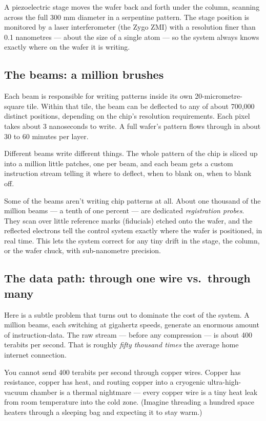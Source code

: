 \documentclass[11pt,letterpaper]{article}
\begin{document}
A piezoelectric stage moves the wafer back and forth under the column, scanning across the full 300 mm diameter in a serpentine pattern. The stage position is monitored by a laser interferometer (the Zygo ZMI) with a resolution finer than 0.1 nanometres --- about the size of a single atom --- so the system always knows exactly where on the wafer it is writing.

\subsection{The beams: a million brushes}

Each beam is responsible for writing patterns inside its own 20-micrometre-square tile. Within that tile, the beam can be deflected to any of about 700{,}000 distinct positions, depending on the chip's resolution requirements. Each pixel takes about 3 nanoseconds to write. A full wafer's pattern flows through in about 30 to 60 minutes per layer.

Different beams write different things. The whole pattern of the chip is sliced up into a million little patches, one per beam, and each beam gets a custom instruction stream telling it where to deflect, when to blank on, when to blank off.

Some of the beams aren't writing chip patterns at all. About one thousand of the million beams --- a tenth of one percent --- are dedicated \emph{registration probes}. They scan over little reference marks (fiducials) etched onto the wafer, and the reflected electrons tell the control system exactly where the wafer is positioned, in real time. This lets the system correct for any tiny drift in the stage, the column, or the wafer chuck, with sub-nanometre precision.

\subsection{The data path: through one wire vs.\ through many}

Here is a subtle problem that turns out to dominate the cost of the system. A million beams, each switching at gigahertz speeds, generate an enormous amount of instruction-data. The raw stream --- before any compression --- is about 400 terabits per second. That is roughly \emph{fifty thousand times} the average home internet connection.

You cannot send 400 terabits per second through copper wires. Copper has resistance, copper has heat, and routing copper into a cryogenic ultra-high-vacuum chamber is a thermal nightmare --- every copper wire is a tiny heat leak from room temperature into the cold zone. (Imagine threading a hundred space heaters through a sleeping bag and expecting it to stay warm.)
\end{document}
